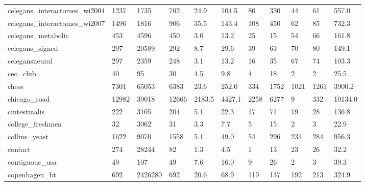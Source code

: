 \begin{longtable}{lllllllllll}
 celegans\_interactomes\_wi2004                       & 1237       & 1735      & 702   & 24.9   & 104.5  & 80    & 330    & 44     & 61     & 557.0   \\
 celegans\_interactomes\_wi2007                       & 1496       & 1816      & 906   & 35.5   & 143.4  & 108   & 450    & 62     & 85     & 732.3   \\
 celegans\_metabolic                                 & 453        & 4596      & 450   & 3.0    & 13.2   & 25    & 15     & 54     & 66     & 161.8   \\
 celegans\_signed                                    & 297        & 20589     & 292   & 8.7    & 29.6   & 39    & 63     & 70     & 80     & 149.1   \\
 celegansneural                                     & 297        & 2359      & 248   & 3.1    & 13.2   & 16    & 35     & 67     & 74     & 103.3   \\
 ceo\_club                                           & 40         & 95        & 30    & 4.5    & 9.8    & 4     & 18     & 2      & 2      & 25.5    \\
 chess                                              & 7301       & 65053     & 6383  & 23.6   & 252.0  & 334   & 1752   & 1021   & 1261   & 3900.2  \\
 chicago\_road                                       & 12982      & 39018     & 12666 & 2183.5 & 4427.1 & 2258  & 6277   & 9      & 332    & 10134.0 \\
 cintestinalis                                      & 222        & 3105      & 204   & 5.1    & 22.3   & 17    & 71     & 19     & 28     & 136.8   \\
 college\_freshmen                                   & 32         & 3062      & 31    & 3.3    & 7.7    & 5     & 15     & 2      & 3      & 22.9    \\
 collins\_yeast                                      & 1622       & 9070      & 1558  & 5.1    & 49.0   & 54    & 296    & 231    & 284    & 956.3   \\
 contact                                            & 274        & 28244     & 82    & 1.3    & 4.5    & 1     & 13     & 23     & 26     & 32.2    \\
 contiguous\_usa                                     & 49         & 107       & 49    & 7.6    & 16.0   & 9     & 26     & 2      & 3      & 39.3    \\
 copenhagen\_bt                                      & 692        & 2426280   & 692   & 20.6   & 68.9   & 119   & 137    & 192    & 213    & 324.9   \\

\end{longtable}

